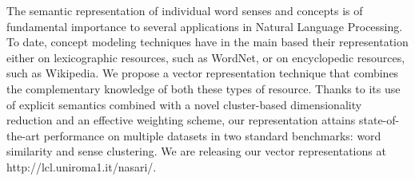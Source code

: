 The semantic representation of individual word senses and concepts is of fundamental importance to several applications in Natural Language Processing. To date, concept modeling techniques have in the main based their representation either on lexicographic resources, such as WordNet, or on encyclopedic resources, such as Wikipedia. We propose a vector representation technique that combines the complementary knowledge of both these types of resource. Thanks to its use of explicit semantics combined with a novel cluster-based dimensionality reduction and an effective weighting scheme, our representation attains state-of-the-art performance on multiple datasets in two standard benchmarks: word similarity and sense clustering. We are releasing our vector representations at http://lcl.uniroma1.it/nasari/.
